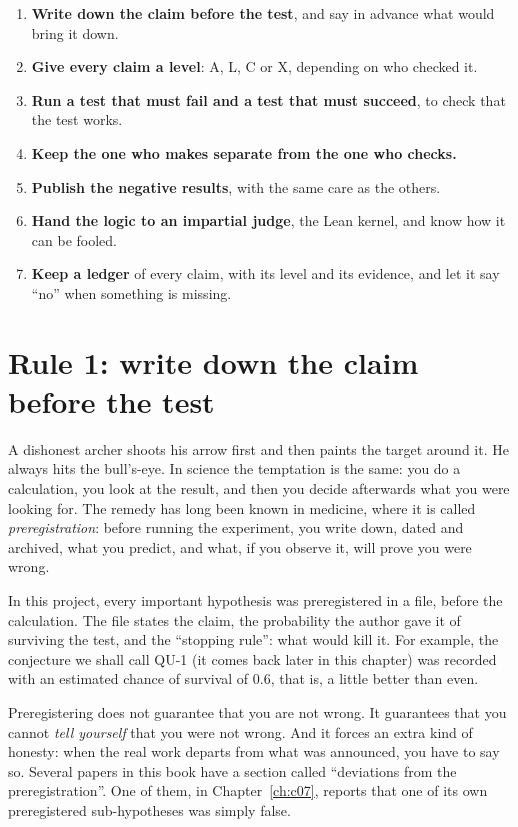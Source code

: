 \begin{encadre}
\begin{enumerate}[leftmargin=1.6em]
\item \textbf{Write down the claim before the test}, and say in advance what would bring it down.
\item \textbf{Give every claim a level}: A, L, C or X, depending on who checked it.
\item \textbf{Run a test that must fail and a test that must succeed}, to check that the test works.
\item \textbf{Keep the one who makes separate from the one who checks.}
\item \textbf{Publish the negative results}, with the same care as the others.
\item \textbf{Hand the logic to an impartial judge}, the Lean kernel, and know how it can be fooled.
\item \textbf{Keep a ledger} of every claim, with its level and its evidence, and let it say ``no'' when something is
missing.
\end{enumerate}
\end{encadre}

\section{Rule 1: write down the claim before the test}

A dishonest archer shoots his arrow first and then paints the target around it. He always hits the bull's-eye. In
science the temptation is the same: you do a calculation, you look at the result, and then you decide afterwards what
you were looking for. The remedy has long been known in medicine, where it is called \emph{preregistration}: before
running the experiment, you write down, dated and archived, what you predict, and what, if you observe it, will prove
you were wrong.

In this project, every important hypothesis was preregistered in a file, before the calculation. The file states the
claim, the probability the author gave it of surviving the test, and the ``stopping rule'': what would kill it. For
example, the conjecture we shall call QU-1 (it comes back later in this chapter) was recorded with an estimated
chance of survival of 0.6, that is, a little better than even.

Preregistering does not guarantee that you are not wrong. It guarantees that you cannot \emph{tell yourself} that you
were not wrong. And it forces an extra kind of honesty: when the real work departs from what was announced, you have
to say so. Several papers in this book have a section called ``deviations from the preregistration''. One of them, in
Chapter~\ref{ch:c07}, reports that one of its own preregistered sub-hypotheses was simply false.

